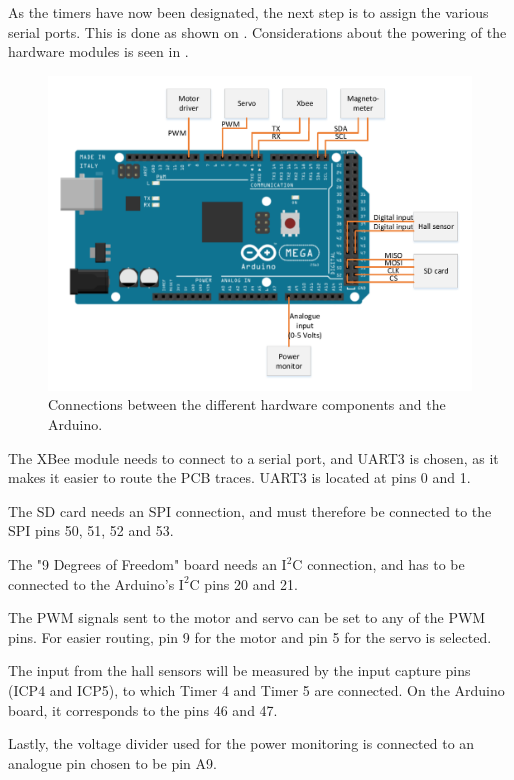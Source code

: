 As the timers have now been designated, the next step is to assign the various serial ports. This is done as shown on . Considerations about the powering of the hardware modules is seen in .	


\begin{figure}[H]
	\centering
	\includegraphics[scale=0.75]{figures/MegaSetup.pdf}
	\caption{Connections between the different hardware components and the Arduino.}
	\label{MegaSetup}
\end{figure}


The XBee module needs to connect to a serial port, and UART3 is chosen, as it makes it easier to route the PCB traces. UART3 is located at pins 0 and 1. 

The SD card needs an SPI connection, and must therefore be connected to the SPI pins 50, 51, 52 and 53. 

The "9 Degrees of Freedom" board needs an $\text{I}^2\text{C}$ connection, and has to be connected to the Arduino's $\text{I}^2\text{C}$ pins 20 and 21. 

The PWM signals sent to the motor and servo can be set to any of the PWM pins. For easier routing, pin 9 for the motor and pin 5 for the servo is selected.

The input from the hall sensors will be measured by the input capture pins (ICP4 and ICP5), to which Timer 4 and Timer 5 are connected. On the Arduino board, it corresponds to the pins 46 and 47.

Lastly, the voltage divider used for the power monitoring is connected to an analogue pin chosen to be pin A9.

